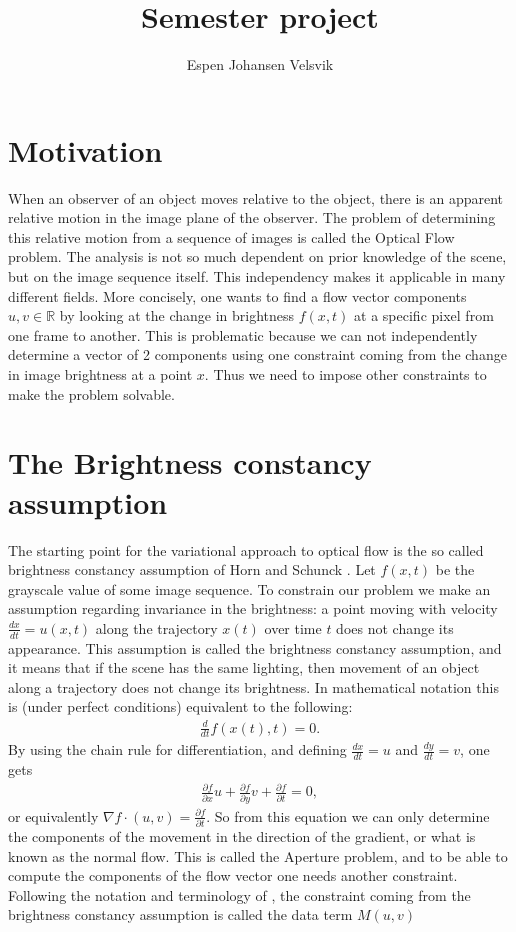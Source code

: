 \documentclass[10pt,a4paper]{article}
\begin{document}
\title{Semester project}
\author{Espen Johansen Velsvik}
\maketitle

\section{Motivation}
When an observer of an object moves relative to the object, there is an apparent relative motion in the image plane of the observer. The problem of determining this relative motion from a sequence of images is called the Optical Flow problem. The analysis is not so much dependent on prior knowledge of the scene, but on the image sequence itself. This independency makes it applicable in many different fields. More concisely, one wants to find a flow vector components $u,v \in \mathbb{R}$ by looking at the change in brightness $f(x,t)$ at a specific pixel from one frame to another. This is problematic because we can not independently determine a vector of 2 components using one constraint coming from the change in image brightness at a point $x$. Thus we need to impose other constraints to make the problem solvable.

\section{The Brightness constancy assumption}
The starting point for the variational approach to optical flow is the so called brightness constancy assumption of Horn and Schunck \cite{HS}. Let $f(x,t)$ be the grayscale value of some image sequence. To constrain our problem we make an assumption regarding invariance in the brightness: a point moving with velocity $\frac{dx}{dt} = u(x,t)$ along the trajectory $x(t)$ over time $t$ does not change its appearance. This assumption is called the brightness constancy assumption, and it means that if the scene has the same lighting, then movement of an object along a trajectory does not change its brightness. In mathematical notation this is (under perfect conditions) equivalent to the following:
\begin{align*}
\frac{d}{dt}f(x(t),t) = 0.
\end{align*}
By using the chain rule for differentiation, and defining $\frac{dx}{dt} = u$ and $\frac{dy}{dt} = v$, one gets
\begin{align*}
\frac{\partial f}{\partial x} u + \frac{\partial f}{\partial y} v + \frac{\partial f}{\partial t} = 0,
\end{align*}
or equivalently $\nabla f \cdot (u,v) = \frac{\partial f}{\partial t}$. So from this equation we can only determine the components of the movement in the direction of the gradient, or what is known as the normal flow. This is called the Aperture problem, and to be able to compute the components of the flow vector one needs another constraint. Following the notation and terminology of \cite{OFH}, the constraint coming from the brightness constancy assumption is called the data term $M(u,v)$
\end{document}
